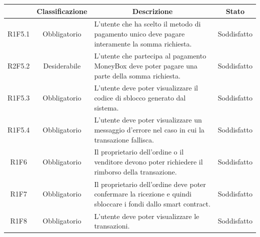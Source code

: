 \begin{table}[H]
    \centering
    \renewcommand{\arraystretch}{1.8}
    \begin{tabular}{c | c | p{6cm} | c}
        \rowcolor[HTML]{125E28}
        \multicolumn{1}{c}{\color[HTML]{FFFFFF} \textbf{Codice}}          &
        \multicolumn{1}{c}{\color[HTML]{FFFFFF} \textbf{Classificazione}} &
        \multicolumn{1}{c}{\color[HTML]{FFFFFF} \textbf{Descrizione}}     &
        \multicolumn{1}{c}{\color[HTML]{FFFFFF} \textbf{Stato}}                                                                                                                                                                                          \\
        \hline
        R1F5.1                                                            & Obbligatorio & L'utente che ha scelto il metodo di pagamento unico deve pagare interamente la somma richiesta.                       & Soddisfatto      \\
        R2F5.2                                                            & Desiderabile & L'utente che partecipa al pagamento MoneyBox\glo{} deve poter pagare una parte della somma richiesta.                 & Soddisfatto      \\
        R1F5.3                                                            & Obbligatorio & L'utente deve poter visualizzare il codice di sblocco generato dal sistema.                                           & Soddisfatto                                 \\
        R1F5.4                                                            & Obbligatorio & L'utente deve poter visualizzare un messaggio d'errore nel caso in cui la transazione fallisca.                       & Soddisfatto                               \\
        R1F6                                                              & Obbligatorio & Il proprietario dell'ordine o il venditore devono poter richiedere il rimborso della transazione.                     & Soddisfatto   \\
        R1F7                                                              & Obbligatorio & Il proprietario dell'ordine deve poter confermare la ricezione e quindi sbloccare i fondi dallo smart contract\glo{}. & Soddisfatto   \\
        R1F8                                                              & Obbligatorio & L'utente deve poter visualizzare le transazioni.                                                                      & Soddisfatto   \\

\end{tabular}
\end{table}

